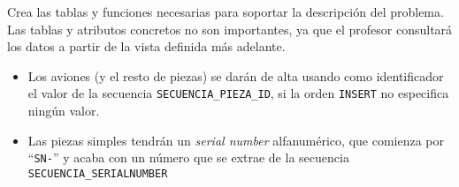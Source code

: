 \begin{homeworkProblem}
  Crea las tablas y funciones necesarias para soportar la descripción del problema. Las tablas y atributos concretos no son importantes, ya que el profesor consultará los datos a partir de la vista definida más adelante.
  
  \begin{itemize}
  \item Los aviones (y el resto de piezas) se darán de alta usando como identificador el valor de la secuencia \texttt{SECUENCIA\_PIEZA\_ID}, si la orden \texttt{INSERT} no especifica ningún valor.
    
  \item Las piezas simples tendrán un \textit{serial number} alfanumérico, que comienza por ``\texttt{SN-}'' y acaba con un número que se extrae de la secuencia \texttt{SECUENCIA\_SERIALNUMBER}
  \end{itemize}

\end{homeworkProblem}

 \setcounter{Avion}{1}
 \setcounter{SN}{1}
 \setcounter{Asiento}{1}
 \setcounter{Motor}{1}
\newcommand{\Contador}[1]{%
  \arabic{#1}%
  \stepcounter{#1}%
}
\newcommand{\FuselajePN}{PN-001}
\newcommand{\AsientoPN}{PN-002}
\newcommand{\ControlesPN}{PN-003}
\newcommand{\MotorPN}{PN-004}

